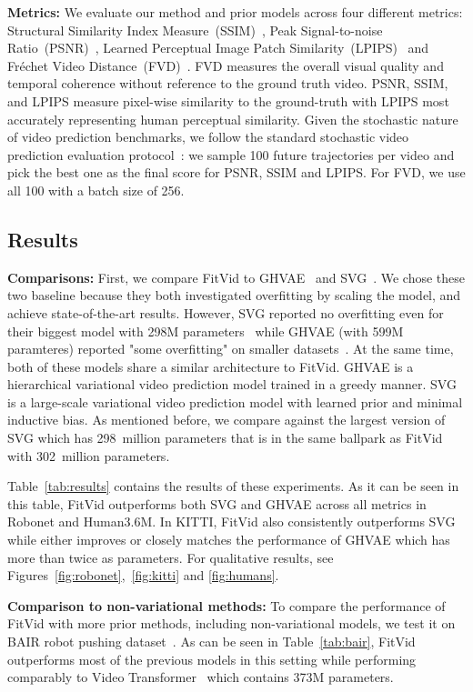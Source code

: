 \documentclass{article}
\newcommand{\model}{FitVid\xspace}
\begin{document}
\textbf{Metrics:}
We evaluate our method and prior  models across four different metrics: Structural Similarity Index Measure~(SSIM)~\citep{wang2004image}, Peak Signal-to-noise Ratio~(PSNR)~\citep{huynh2008scope}, Learned Perceptual Image Patch Similarity~(LPIPS)~\cite{zhang2018perceptual} and Fréchet Video Distance~(FVD)~\cite{unterthiner2018towards}. FVD measures the overall visual quality and temporal coherence without reference to the ground truth video. PSNR, SSIM, and LPIPS measure pixel-wise similarity to the ground-truth with LPIPS most accurately representing human perceptual similarity. Given the stochastic nature of video prediction benchmarks, we follow the standard stochastic video prediction evaluation protocol~\cite{babaeizadeh2017stochastic, villegas2019high, wu2021greedy}: we sample 100 future trajectories per video and pick the best one as the final score for PSNR, SSIM and LPIPS. For FVD, we use all 100 with a batch size of 256.  


\subsection{Results}
\textbf{Comparisons:}
First, we compare \model to GHVAE~\cite{wu2021greedy} and SVG~\cite{villegas2019high}. We chose these two baseline because they both investigated overfitting
by scaling the model, and achieve state-of-the-art results. However, SVG reported no overfitting even for their biggest model with 298M parameters~\cite{villegas2019high} while GHVAE (with 599M paramteres) reported "some overfitting" on smaller datasets~\cite{wu2021greedy}. At the same time, both of these models share a similar architecture to \model. GHVAE is a hierarchical variational video prediction model trained in a greedy manner. SVG is a large-scale variational video prediction model with learned prior and minimal inductive bias. As mentioned before, we compare against the largest version of SVG  which has 298~million parameters that is in the same ballpark as \model with 302~million parameters.

Table~\ref{tab:results} contains the results of these experiments. As it can be seen in this table, \model outperforms both SVG and GHVAE across all metrics in Robonet and Human3.6M. In KITTI, \model also consistently outperforms SVG while either improves or closely matches the performance of GHVAE which has more than twice as parameters. For qualitative results, see Figures~\ref{fig:robonet},~\ref{fig:kitti} and \ref{fig:humans}.

\textbf{Comparison to non-variational methods:}
To compare the performance of \model with more prior methods, including non-variational models, we test it on BAIR robot pushing dataset~\cite{2017arXiv171005268E}. As can be seen in Table~\ref{tab:bair}, \model outperforms most of the previous models in this setting while performing comparably to Video Transformer~\cite{weissenborn2019scaling} which contains 373M parameters.
\end{document}
